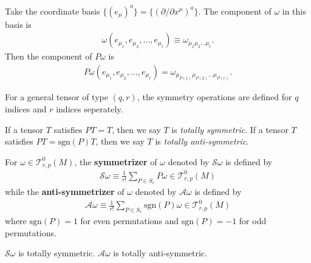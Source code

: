 \documentclass[10pt]{article}
\begin{document}
Take the coordinate basis $\{(e_\mu)^a\}=\{(\partial/\partial x^\mu)^a\}$.
The component of $\omega$ in this basis is
\begin{align}
    \omega(e_{\mu_1},e_{\mu_2},\dots,e_{\mu_r})\equiv\omega_{\mu_1\mu_2\dots\mu_r}.
\end{align}
Then the component of $P\omega$ is
\begin{align}
    P\omega(e_{\mu_1},e_{\mu_2},\dots,e_{\mu_r})=\omega_{\mu_{P(1)}\mu_{P(2)}\dots\mu_{P(r)}}.
\end{align}
\begin{remark}
    For a general tensor of type $(q,r)$, the symmetry operations are defined for $q$ indices and $r$ indices seperately.

    If a tensor $T$ satisfies $PT=T$, then we say $T$ is \textit{totally symmetric}.
    If a tensor $T$ satisfies $PT=\text{sgn}(P)T$, then we say $T$ is \textit{totally anti-symmetric}.
\end{remark}
\begin{definition}
    For $\omega\in\mathcal{T}^0_{r,p}(M)$, the \textbf{symmetrizer} of $\omega$ denoted by $\mathcal{S}\omega$ is defined by
    \begin{align}
        \mathcal{S}\omega\equiv\frac{1}{r!}\sum_{P\in S_r}P\omega\in\mathcal{T}^0_{r,p}(M)
    \end{align}
    while the \textbf{anti-symmetrizer} of $\omega$ denoted by $\mathcal{A}\omega$ is defined by
    \begin{align}
        \mathcal{A}\omega\equiv\frac{1}{r!}\sum_{P\in S_r}\text{sgn}(P)\omega\in\mathcal{T}^0_{r,p}(M)
    \end{align}
    where $\text{sgn}(P)=1$ for even permutations and $\text{sgn}(P)=-1$ for odd permutations.
\end{definition}
\begin{remark}
    $\mathcal{S}\omega$ is totally symmetric.
    $\mathcal{A}\omega$ is totally anti-symmetric.
\end{remark}
\end{document}
